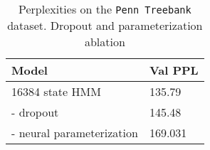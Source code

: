 \documentclass[11pt,a4paper]{article}
\begin{document}
\begin{table}[!t]
\centering
\caption{\label{tbl:dropout-param-ablation}
Perplexities on the \texttt{Penn Treebank} dataset.
Dropout and parameterization ablation
}
\begin{tabular}{ll}
\toprule
Model & Val PPL\\
\midrule
16384 state HMM & 135.79\\
\quad - dropout & 145.48\\
\quad - neural parameterization & 169.031\\
\bottomrule
\end{tabular}
\end{table}



\begin{comment}

\begin{table}[!t]
\centering
\caption{\label{tbl:ppl-wikitext2}
Perplexities on the \texttt{wikitext2} dataset.
The FF model is a 256-dim 2-layer feedforward neural network
with a window of 4 previous tokens with 0.3 dropout.
The LSTM is a 256-dim 2-layer recurrent neural network with 0.3 dropout.
The HMM is a 32k-state HMM with 0.5 state dropout.
}
\begin{tabular}{llll}
\toprule
Model & Num params & Valid PPL & Test PPL\\
\midrule
FF    &            & 209       & -       \\
LSTM  &            & 125       & -       \\
HMM   &            & 167       & -       \\
\bottomrule
\end{tabular}
\end{table}

\paragraph{Sparse emission constraint ablation}
We ablate the emission sparsity constraints in Table \ref{tbl:ppl-assn-ablation},
and find that the Brown emission constraints outperforms the uniform emission constraints
in all model sizes.

One explanation for the relative benefit of Brown emission constraints over uniform
is due to the effect of Brown clusters.
The goal of Brown clustering is to place two words in the same cluster
if they are used in the same context.
In Table \ref{tbl:entropy}, we observe that the entropy of the emission distribution
for models with uniform emission
constraints is lower than models with brown constraints,
and the entropy of the transition distributions is higher.
This implies that the burden of modeling ambiguity is pushed onto
the transition distribution,
since the uniform models are less likely to place words that appear in
similar contexts together.


\end{comment}
\end{document}
